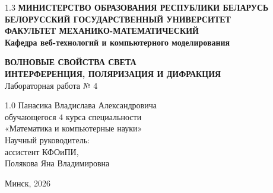 \documentclass[12pt,a4paper]{article}
\begin{document}
\begin{titlepage}
\begin{center}
\begin{spacing}{1.3}
\textbf{МИНИСТЕРСТВО ОБРАЗОВАНИЯ РЕСПУБЛИКИ БЕЛАРУСЬ}\\[0.25cm]
\textbf{БЕЛОРУССКИЙ ГОСУДАРСТВЕННЫЙ УНИВЕРСИТЕТ}\\[0.25cm]
\textbf{ФАКУЛЬТЕТ МЕХАНИКО-МАТЕМАТИЧЕСКИЙ}\\[0.25cm]
\textbf{Кафедра веб-технологий и компьютерного моделирования}
\end{spacing}
\vspace{4.2cm}
\textbf{ВОЛНОВЫЕ СВОЙСТВА СВЕТА}\\[0.2cm]
\textbf{ИНТЕРФЕРЕНЦИЯ, ПОЛЯРИЗАЦИЯ И ДИФРАКЦИЯ}\\[0.4cm]
Лабораторная работа № 4
\end{center}
\vspace{3.4cm}
\noindent\hspace*{0.48\textwidth}\begin{minipage}{0.52\textwidth}
\begin{spacing}{1.0}
Панасика Владислава Александровича\\
обучающегося 4 курса специальности\\
«Математика и компьютерные науки»\\[0.6cm]
Научный руководитель:\\
ассистент КФОиПИ,\\
Полякова Яна Владимировна
\end{spacing}
\end{minipage}
\vfill
\begin{center}Минск, 2026\end{center}
\end{titlepage}
\setcounter{page}{2}
\tableofcontents
\clearpage
\end{document}
